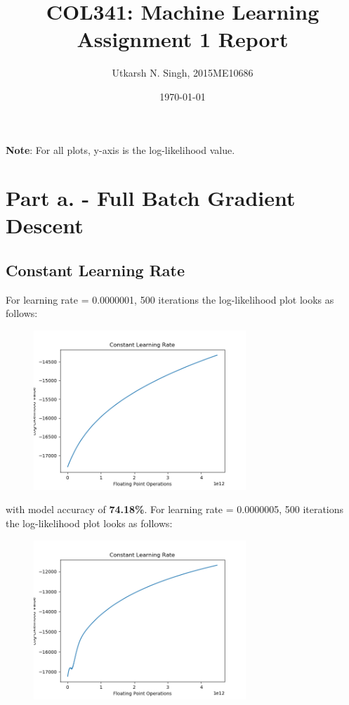 \documentclass[a4paper]{article}
\title{COL341: Machine Learning \\ \Large{Assignment 1 Report}}
\author{Utkarsh N. Singh, 2015ME10686}
\date{\today}
\begin{document}
\maketitle

\textbf{Note}: For all plots, y-axis is the log-likelihood value.

\section*{Part a. - Full Batch Gradient Descent}
\label{sec:parta}
\subsection*{Constant Learning Rate}
For learning rate = 0.0000001, 500 iterations the log-likelihood plot looks as follows:
\begin{figure}[h!]
\centering
\includegraphics[width=8cm,height=6cm]{clr_0000001_500_7418.png}
\end{figure}

\noindent with model accuracy of \textbf{74.18\%}.
\vskip 0.1in
\noindent For learning rate = 0.0000005, 500 iterations the log-likelihood plot looks as follows:

\begin{figure}[h!]
\centering
\includegraphics[width=8cm,height=6cm]{clr_0000005_500_8078.png}
\end{figure}
\end{document}

